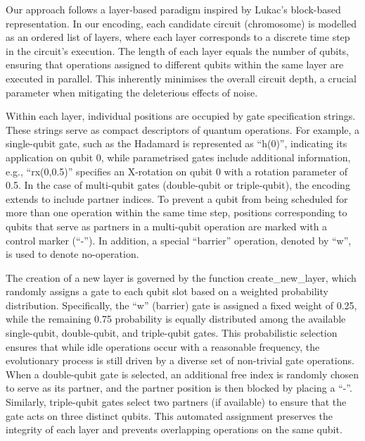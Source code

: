 \documentclass[11pt,a4paper]{article}
\begin{document}
Our approach follows a layer‐based paradigm inspired by Lukac’s \cite{Lukac2002EvolvingQC} block-based representation. In our encoding, each candidate circuit (chromosome) is modelled as an ordered list of layers, where each layer corresponds to a discrete time step in the circuit’s execution. The length of each layer equals the number of qubits, ensuring that operations assigned to different qubits within the same layer are executed in parallel. This inherently minimises the overall circuit depth, a crucial parameter when mitigating the deleterious effects of noise.\newline

Within each layer, individual positions are occupied by gate specification strings. These strings serve as compact descriptors of quantum operations. For example, a single-qubit gate, such as the Hadamard is represented as “h(0)”, indicating its application on qubit 0, while parametrised gates include additional information, e.g., “rx(0,0.5)” specifies an X-rotation on qubit 0 with a rotation parameter of 0.5. In the case of multi-qubit gates (double-qubit or triple-qubit), the encoding extends to include partner indices. To prevent a qubit from being scheduled for more than one operation within the same time step, positions corresponding to qubits that serve as partners in a multi-qubit operation are marked with a control marker (“-”). In addition, a special “barrier” operation, denoted by “w”, is used to denote no-operation.\newline

The creation of a new layer is governed by the function create\_new\_layer, which randomly assigns a gate to each qubit slot based on a weighted probability distribution. Specifically, the “w” (barrier) gate is assigned a fixed weight of 0.25, while the remaining 0.75 probability is equally distributed among the available single-qubit, double-qubit, and triple-qubit gates. This probabilistic selection ensures that while idle operations occur with a reasonable frequency, the evolutionary process is still driven by a diverse set of non-trivial gate operations. When a double-qubit gate is selected, an additional free index is randomly chosen to serve as its partner, and the partner position is then blocked by placing a “-”. Similarly, triple-qubit gates select two partners (if available) to ensure that the gate acts on three distinct qubits. This automated assignment preserves the integrity of each layer and prevents overlapping operations on the same qubit.\newline
\end{document}
